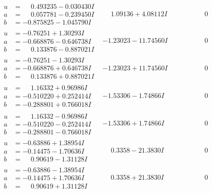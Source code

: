 \documentclass[1p]{elsarticle_modified}
\theoremstyle{definition}
\begin{document}
$$\begin{array}{c|c|c}
\begin{aligned}
u &= \phantom{-}0.493235 - 0.030430 I \\
a &= \phantom{-}0.057781 - 0.239450 I \\
b &= -0.875825 - 1.045790 I\end{aligned}
 & \phantom{-}1.09136 + 4.08112 I & \phantom{-0.000000 } 0 \\ \hline\begin{aligned}
u &= -0.76251 + 1.30293 I \\
a &= -0.668876 - 0.646738 I \\
b &= \phantom{-}0.133876 - 0.887021 I\end{aligned}
 & -1.23023 - 11.74560 I & \phantom{-0.000000 } 0 \\ \hline\begin{aligned}
u &= -0.76251 - 1.30293 I \\
a &= -0.668876 + 0.646738 I \\
b &= \phantom{-}0.133876 + 0.887021 I\end{aligned}
 & -1.23023 + 11.74560 I & \phantom{-0.000000 } 0 \\ \hline\begin{aligned}
u &= \phantom{-}1.16332 + 0.96986 I \\
a &= -0.510220 + 0.252414 I \\
b &= -0.288801 + 0.766018 I\end{aligned}
 & -1.53306 - 1.74866 I & \phantom{-0.000000 } 0 \\ \hline\begin{aligned}
u &= \phantom{-}1.16332 - 0.96986 I \\
a &= -0.510220 - 0.252414 I \\
b &= -0.288801 - 0.766018 I\end{aligned}
 & -1.53306 + 1.74866 I & \phantom{-0.000000 } 0 \\ \hline\begin{aligned}
u &= -0.63886 + 1.38954 I \\
a &= -0.14475 - 1.70636 I \\
b &= \phantom{-}0.90619 - 1.31128 I\end{aligned}
 & \phantom{-}0.3358 - 21.3830 I & \phantom{-0.000000 } 0 \\ \hline\begin{aligned}
u &= -0.63886 - 1.38954 I \\
a &= -0.14475 + 1.70636 I \\
b &= \phantom{-}0.90619 + 1.31128 I\end{aligned}
 & \phantom{-}0.3358 + 21.3830 I & \phantom{-0.000000 } 0\\

\end{array}$$
\end{document}
